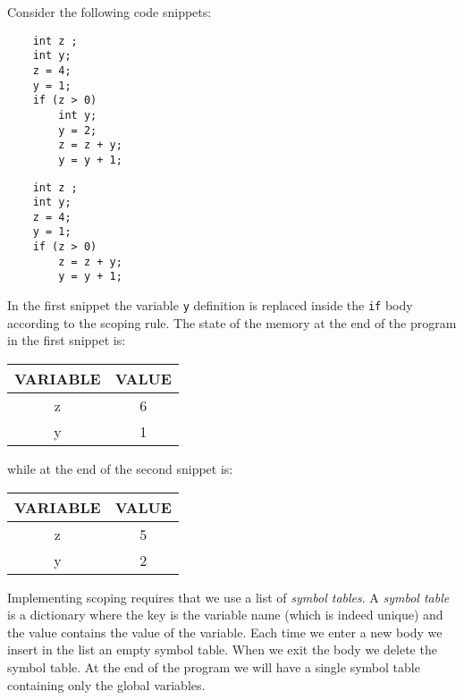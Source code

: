 \begin{example}
Consider the following code snippets:
\begin{lstlisting}
	int z ;
	int y;
	z = 4;
	y = 1;
	if (z > 0)
		int y;
		y = 2;
		z = z + y;
		y = y + 1;
\end{lstlisting}

\begin{lstlisting}
	int z ;
	int y;
	z = 4;
	y = 1;
	if (z > 0)
		z = z + y;
		y = y + 1;
\end{lstlisting}

\noindent
In the first snippet the variable \texttt{y} definition is replaced inside the \texttt{if} body according to the scoping rule. The state of the memory at the end of the program in the first snippet is:

\begin{table}[!h]
\centering
\begin{tabular}{|c|c|}
\hline
\textbf{VARIABLE} & \textbf{VALUE}\\
\hline
z & 6\\
\hline
y & 1\\
\hline
\end{tabular}
\end{table}

\noindent
while at the end of the second snippet is:

\begin{table}[!h]
\centering
\begin{tabular}{|c|c|}
\hline
\textbf{VARIABLE} & \textbf{VALUE}\\
\hline
z & 5\\
\hline
y & 2\\
\hline
\end{tabular}
\end{table}

\end{example}

Implementing scoping requires that we use a list of \textit{symbol tables}. A \textit{symbol table} is a dictionary where the key is the variable name (which is indeed unique) and the value contains the value of the variable. Each time we enter a new body we insert in the list an empty symbol table. When we exit the body we delete the symbol table. At the end of the program we will have a single symbol table containing only the global variables.